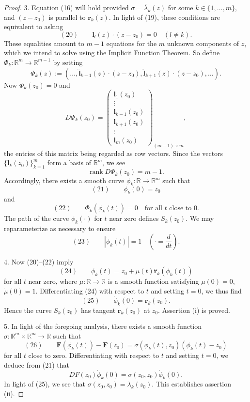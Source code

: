 \begin{proof}
3. Equation (16) will hold provided $\sigma = \bar\lambda_k(z)$ for some $k\in\{1,\ldots,m\}$, and $(z-z_0)$ is parallel to $\mathbf{r}_k(z)$. In light of (19), these conditions are equivalent to asking
$$(20) \qquad \mathbf{l}_l(z)\cdot(z-z_0) = 0 \quad (l\neq k).$$
These equalities amount to $m-1$ equations for the $m$ unknown components of $z$, which we intend to solve using the Implicit Function Theorem. So define $\Phi_k:\mathbb{R}^m\to\mathbb{R}^{m-1}$ by setting
$$\Phi_k(z) := (\ldots, \hat{\mathbf{l}}_{k-1}(z)\cdot(z-z_0), \hat{\mathbf{l}}_{k+1}(z)\cdot(z-z_0), \ldots).$$
Now $\Phi_k(z_0) = 0$ and
$$D\Phi_k(z_0) = \begin{pmatrix} \mathbf{l}_1(z_0) \\ \vdots \\ \mathbf{l}_{k-1}(z_0) \\ \mathbf{l}_{k+1}(z_0) \\ \vdots \\ \mathbf{l}_m(z_0) \end{pmatrix}_{(m-1)\times m},$$
the entries of this matrix being regarded as row vectors. Since the vectors $\{\mathbf{l}_k(z_0)\}_{k=1}^m$ form a basis of $\mathbb{R}^m$, we see
$$\operatorname{rank} D\Phi_k(z_0) = m-1.$$
Accordingly, there exists a smooth curve $\phi_k:\mathbb{R}\to\mathbb{R}^m$ such that
$$(21) \qquad \phi_k(0) = z_0$$
and
$$(22) \qquad \Phi_k(\phi_k(t)) = 0 \quad \text{for all } t \text{ close to } 0.$$
The path of the curve $\phi_k(\cdot)$ for $t$ near zero defines $S_k(z_0)$. We may reparameterize as necessary to ensure
$$(23) \qquad |\dot\phi_k(t)| = 1 \quad \left(\cdot = \frac{d}{dt}\right).$$

4. Now (20)--(22) imply
$$(24) \qquad \phi_k(t) = z_0 + \mu(t)\hat{\mathbf{r}}_k(\phi_k(t))$$
for all $t$ near zero, where $\mu:\mathbb{R}\to\mathbb{R}$ is a smooth function satisfying $\mu(0)=0$, $\dot\mu(0)=1$. Differentiating (24) with respect to $t$ and setting $t=0$, we thus find
$$(25) \qquad \dot\phi_k(0) = \mathbf{r}_k(z_0).$$
Hence the curve $S_k(z_0)$ has tangent $\mathbf{r}_k(z_0)$ at $z_0$. Assertion (i) is proved.

5. In light of the foregoing analysis, there exists a smooth function $\sigma:\mathbb{R}^m\times\mathbb{R}^m\to\mathbb{R}$ such that
$$(26) \qquad \mathbf{F}(\phi_k(t)) - \mathbf{F}(z_0) = \sigma(\phi_k(t),z_0)(\phi_k(t)-z_0)$$
for all $t$ close to zero. Differentiating with respect to $t$ and setting $t=0$, we deduce from (21) that
$$DF(z_0)\dot\phi_k(0) = \sigma(z_0,z_0)\dot\phi_k(0).$$
In light of (25), we see that $\sigma(z_0,z_0) = \lambda_k(z_0)$. This establishes assertion (ii).


\end{proof}
